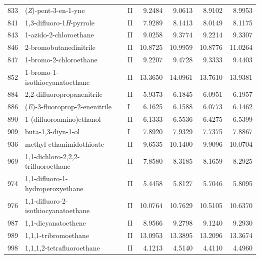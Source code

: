 \begin{longtable}{rlld{2.5}d{2.5}d{2.5}d{2.5}}
    833  & (\textit{Z})-pent-3-en-1-yne                           & II & 9.2484  & 9.0613  & 8.9102  & 8.9953  \\
    841  & 1,3-difluoro-1\textit{H}-pyrrole                       & II & 7.9289  & 8.1413  & 8.0149  & 8.1175  \\
    843  & 1-azido-2-chloroethane                                 & II & 9.0258  & 9.3774  & 9.2214  & 9.3307  \\
    846  & 2-bromobutanedinitrile                                 & II & 10.8725 & 10.9959 & 10.8776 & 11.0264 \\
    847  & 1-bromo-2-chloroethane                                 & II & 9.2207  & 9.4728  & 9.3333  & 9.4403  \\
    852  & 1-bromo-1-isothiocyanatoethane                         & II & 13.3650 & 14.0961 & 13.7610 & 13.9381 \\
    884  & 2,2-difluoropropanenitrile                             & II & 5.9373  & 6.1845  & 6.0951  & 6.1957  \\
    886  & (\textit{E})-3-fluoroprop-2-enenitrile                 & I  & 6.1625  & 6.1588  & 6.0773  & 6.1462  \\
    890  & 1-(difluoroamino)ethanol                               & II & 6.1333  & 6.5536  & 6.4275  & 6.5399  \\
    909  & buta-1,3-diyn-1-ol                                     & I  & 7.8920  & 7.9329  & 7.7375  & 7.8867  \\
    936  & methyl ethanimidothioate                               & II & 9.6535  & 10.1400 & 9.9096  & 10.0704 \\
    969  & 1,1-dichloro-2,2,2-trifluoroethane                     & II & 7.8580  & 8.3185  & 8.1659  & 8.2925  \\
    974  & 1,1-difluoro-1-hydroperoxyethane                       & II & 5.4458  & 5.8127  & 5.7046  & 5.8095  \\
    976  & 1,1-difluoro-2-isothiocyanatoethane                    & II & 10.0764 & 10.7629 & 10.5105 & 10.6370 \\
    987  & 1,1-dicyanatoethene                                    & II & 8.9566  & 9.2798  & 9.1240  & 9.2930  \\
    989  & 1,1,1-tribromoethane                                   & II & 13.0953 & 13.3895 & 13.2096 & 13.3674 \\
    998  & 1,1,1,2-tetrafluoroethane                              & II & 4.1213  & 4.5140  & 4.4110  & 4.4960  \\

\end{longtable}
